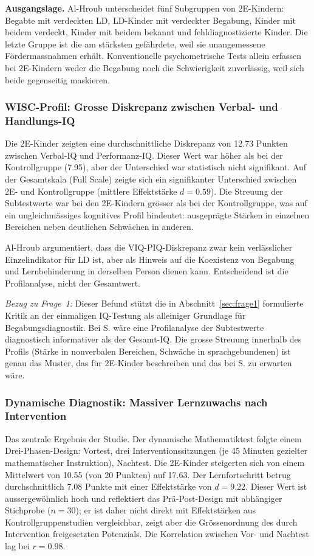 \documentclass[ngerman, a4paper]{article}
\begin{document}
\textbf{Ausgangslage.} Al-Hroub unterscheidet fünf Subgruppen von
2E-Kindern: Begabte mit verdeckten LD, LD-Kinder mit verdeckter Begabung,
Kinder mit beidem verdeckt, Kinder mit beidem bekannt und
fehldiagnostizierte Kinder. Die letzte Gruppe ist die am stärksten
gefährdete, weil sie unangemessene Fördermassnahmen erhält. Konventionelle
psychometrische Tests allein erfassen bei 2E-Kindern weder die Begabung
noch die Schwierigkeit zuverlässig, weil sich beide gegenseitig maskieren.

\subsubsection*{WISC-Profil: Grosse Diskrepanz zwischen Verbal- und
  Handlungs-IQ}

Die 2E-Kinder zeigten eine durchschnittliche Diskrepanz von 12.73 Punkten
zwischen Verbal-IQ und Performanz-IQ. Dieser Wert war höher als bei der
Kontrollgruppe (7.95), aber der Unterschied war statistisch nicht
signifikant. Auf der Gesamtskala (Full Scale) zeigte sich ein
signifikanter Unterschied zwischen 2E- und Kontrollgruppe (mittlere
Effektstärke $d = 0.59$). Die Streuung der Subtestwerte war bei den
2E-Kindern grösser als bei der Kontrollgruppe, was auf ein
ungleichmässiges kognitives Profil hindeutet: ausgeprägte Stärken in
einzelnen Bereichen neben deutlichen Schwächen in anderen.

Al-Hroub argumentiert, dass die VIQ-PIQ-Diskrepanz zwar kein verlässlicher
Einzelindikator für LD ist, aber als Hinweis auf die Koexistenz von
Begabung und Lernbehinderung in derselben Person dienen kann. Entscheidend
ist die Profilanalyse, nicht der Gesamtwert.

\textit{Bezug zu Frage~1:} Dieser Befund stützt die in
Abschnitt~\ref{sec:frage1} formulierte Kritik an der einmaligen
IQ-Testung als alleiniger Grundlage für Begabungsdiagnostik. Bei S. wäre
eine Profilanalyse der Subtestwerte diagnostisch informativer als der
Gesamt-IQ. Die grosse Streuung innerhalb des Profils (Stärke in
nonverbalen Bereichen, Schwäche in sprachgebundenen) ist genau das Muster,
das \textcite{preckel2013hochbegabung} für 2E-Kinder beschreiben und das
bei S. zu erwarten wäre.

\subsubsection*{Dynamische Diagnostik: Massiver Lernzuwachs nach
  Intervention}

Das zentrale Ergebnis der Studie. Der dynamische Mathematiktest folgte
einem Drei-Phasen-Design: Vortest, drei Interventionssitzungen (je 45
Minuten gezielter mathematischer Instruktion), Nachtest. Die 2E-Kinder
steigerten sich von einem Mittelwert von 10.55 (von 20 Punkten) auf
17.63. Der Lernfortschritt betrug durchschnittlich 7.08 Punkte mit einer
Effektstärke von $d = 9.22$. Dieser Wert ist aussergewöhnlich hoch und
reflektiert das Prä-Post-Design mit abhängiger Stichprobe ($n = 30$); er
ist daher nicht direkt mit Effektstärken aus Kontrollgruppenstudien
vergleichbar, zeigt aber die Grössenordnung des durch Intervention
freigesetzten Potenzials. Die
Korrelation zwischen Vor- und Nachtest lag bei $r = 0.98$.
\end{document}
